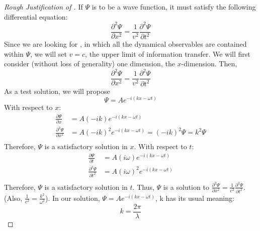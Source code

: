 \begin{proof}[Rough Justification of ] \label{proof:Schrodinger's Equation Justification}
		If $\Psi$ is to be a wave function, it must satisfy the following differential equation:
		\begin{equation*}
			\frac{\partial^{2} \Psi}{\partial x^{2}} = \frac{1}{v^{2}} \frac{\partial^{2} \Psi}{\partial t^{2}}
		\end{equation*}
		Since we are looking for , in which all the dynamical observables are contained within $\Psi$, we will set $v=c$, the upper limit of information transfer.
		We will first consider (without loss of generality) one dimension, the $x$-dimension.
		Then,
		\begin{equation*}
			\frac{\partial^{2} \Psi}{\partial x^{2}} = \frac{1}{v^{2}} \frac{\partial^{2} \Psi}{\partial t^{2}}
		\end{equation*}
		As a test solution, we will propose
		\begin{equation*}
			\Psi = A e^{-i \left( kx-\omega t \right)}
		\end{equation*}
		With respect to $x$:
		\begin{align*}
			\frac{\partial \Psi}{\partial x} &= A \left( -ik \right) e^{-i \left( kx-\omega t \right)} \\
			\frac{\partial^{2} \Psi}{\partial x^{2}} &= A \left( -ik \right)^{2} e^{-i \left( kx-\omega t \right)} = \left( -ik \right)^{2} \Psi = k^{2} \Psi \\
		\end{align*}
		Therefore, $\Psi$ is a satisfactory solution in $x$.
		With respect to $t$:
		\begin{align*}
			\frac{\partial \Psi}{\partial t} &= A \left( i\omega \right) e^{-i \left( kx-\omega t \right)} \\
			\frac{\partial^{2} \Psi}{\partial t^{2}} &= A \left( i\omega \right)^{2} e^{-i \left( kx-\omega t \right)} \\
		\end{align*}
		Therefore, $\Psi$ is a satisfactory solution in $t$.
		Thus, $\Psi$ is a solution to $\frac{\partial^{2} \Psi}{\partial x^{2}} = \frac{1}{c^{2}} \frac{\partial^{2} \Psi}{\partial t^{2}}$.
		(Also, $\frac{1}{c^{2}} = \frac{k^{2}}{\omega^{2}}$). \newline
		In our solution, $\Psi = A e^{-i \left( kx-\omega t \right)} $, k has its usual meaning:
		\begin{equation*} 
			k = \frac{2 \pi}{\lambda}

\end{equation*}
\end{proof}
